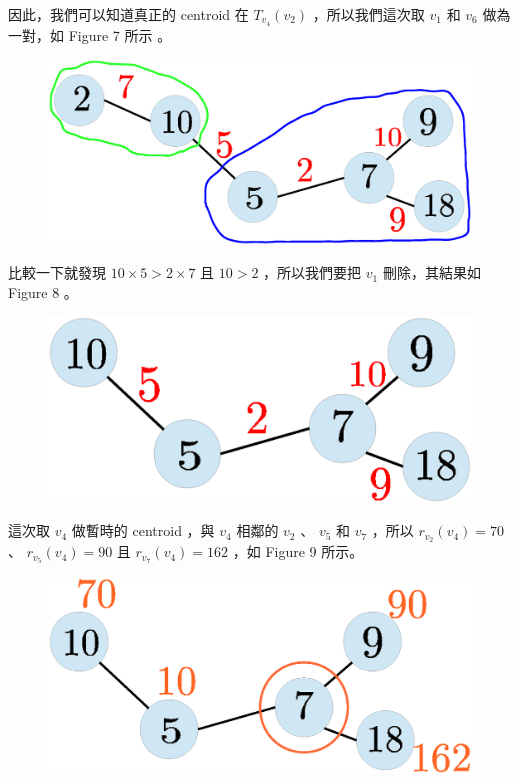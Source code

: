 \documentclass[12pt]{article}
\begin{document}
\begin{CJK}{UTF8}{bkai}
因此，我們可以知道真正的 centroid 在 $T_{v_4}(v_2)$ ，所以我們這次取 $v_1$ 和 $v_6$ 做為一對，如 Figure 7 所示 。

\begin{figure}[H]
\centering
\includegraphics[scale=0.3]{fig7.eps}
\caption{}
\end{figure}

比較一下就發現 $10 \times 5 > 2 \times 7$ 且 $10 > 2$ ，所以我們要把 $v_1$ 刪除，其結果如 Figure 8 。

\begin{figure}[H]
\centering
\includegraphics[scale=0.3]{fig8.eps}
\caption{}
\end{figure}

這次取 $v_4$ 做暫時的 centroid ，與 $v_4$ 相鄰的 $v_2$ 、 $v_5$ 和 $v_7$ ，所以 $r_{v_2}(v_4)=70$ 、 $r_{v_5}(v_4)=90$ 且
$r_{v_7}(v_4)=162$ ，如 Figure 9 所示。

\begin{figure}[H]
\centering
\includegraphics[scale=0.3]{fig9.eps}
\caption{}
\end{figure}


\end{CJK}
\end{document}
